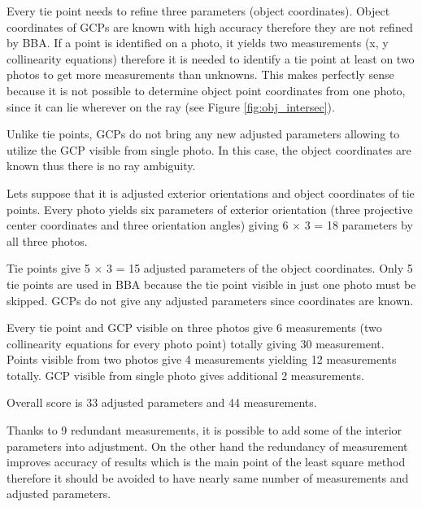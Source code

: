 \documentclass[a4paper,12pt]{article}
\begin{document}

Every tie point needs to refine three parameters (object coordinates). 
Object coordinates of GCPs are known with high accuracy therefore they are not refined by BBA. 
If a point is identified on a photo, it yields two measurements (x, y collinearity equations) 
therefore it is needed to identify a tie point at least on two photos to get more measurements 
than unknowns. This makes perfectly sense because it is not possible to determine object point coordinates from one photo,
since it can lie wherever on the ray (see Figure \ref{fig:obj_intersec}).

Unlike tie points, GCPs do not bring any new adjusted parameters 
allowing to utilize the GCP visible from single photo. In this case, the object coordinates 
are known thus there is no ray ambiguity. 

Lets suppose that it is adjusted exterior orientations and object coordinates of tie points.  
Every photo yields six parameters of exterior orientation (three projective center coordinates and three orientation angles) 
 giving 6 $\times$ 3 = 18 parameters by all three photos. 

Tie points give 5 $\times$ 3 = 15 adjusted parameters of the object coordinates. 
Only 5 tie points are used in BBA because the tie point visible in just one photo must be skipped.
GCPs do not give any adjusted parameters since coordinates are known.

Every tie point and GCP visible on three photos give 6 measurements (two collinearity equations for every photo point)
totally giving 30 measurement.
Points visible from two photos give 4 measurements yielding 12 measurements totally.
GCP visible from single photo gives additional 2 measurements.

Overall score is 33 adjusted parameters and 44 measurements.

Thanks to 9 redundant measurements, it is possible to add some of the interior parameters into adjustment.  
On the other hand the redundancy of measurement improves accuracy of results which is the main point of the least square method
therefore it should be avoided to have nearly same number of measurements and adjusted parameters.


\end{document}
